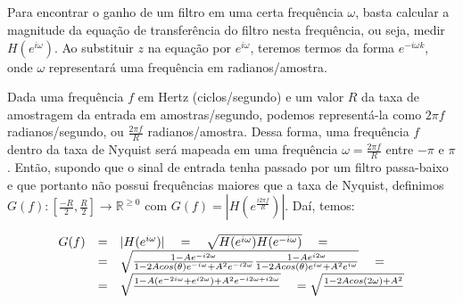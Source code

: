 \subsection{}

Para encontrar o ganho de um filtro em uma certa frequência $\omega$, basta
calcular a magnitude da equação de transferência do filtro nesta frequência, ou
seja, medir $H(e^{i\omega})$. Ao substituir $z$ na equação por $e^{i\omega}$,
teremos termos da forma $e^{-i\omega k}$, onde $\omega$ representará uma
frequência em radianos/amostra.

Dada uma frequência $f$ em Hertz (ciclos/segundo) e um valor $R$ da taxa de
amostragem da entrada em amostras/segundo, podemos representá-la como $2 \pi f$
radianos/segundo, ou $\frac{2 \pi f}{R}$ radianos/amostra. Dessa forma, uma
frequência $f$ dentro da taxa de Nyquist será mapeada em uma frequência $\omega
= \frac{2 \pi f}{R}$ entre $-\pi$ e $\pi$. Então, supondo que o sinal de
entrada tenha passado por um filtro passa-baixo e que portanto não possui
frequências maiores que a taxa de Nyquist, definimos
$G(f):[\frac{-R}{2},\frac{R}{2}] \rightarrow \mathbb{R}^{\ge 0}$ com $G(f) =
|H(e^{\frac{i 2 \pi f}{R}})|$. Daí, temos:

\[\displaystyle
\begin{array}{l c l}
  G(f) & = & |H(e^{i\omega})| \quad = \quad \sqrt{H(e^{i\omega})H(e^{-i\omega})} \quad = \\
       & = & \sqrt{ \frac{1-Ae^{-i2\omega}}{1-2Acos(\theta)e^{-i\omega}+A^2 e^{-i2\omega}} \frac{1-Ae^{i2\omega}}{1-2Acos(\theta)e^{i\omega}+A^2 e^{i\omega}}} \quad = \\
       & = & \sqrt{\frac{1-A(e^{-2i\omega}+e^{i2\omega})+A^2e^{-i2\omega+i2\omega}}{}} \quad = \sqrt{\frac{1-2Acos(2\omega)+A^2}{}}\\
\end{array}
\]



\subsection{}


\subsection{}
